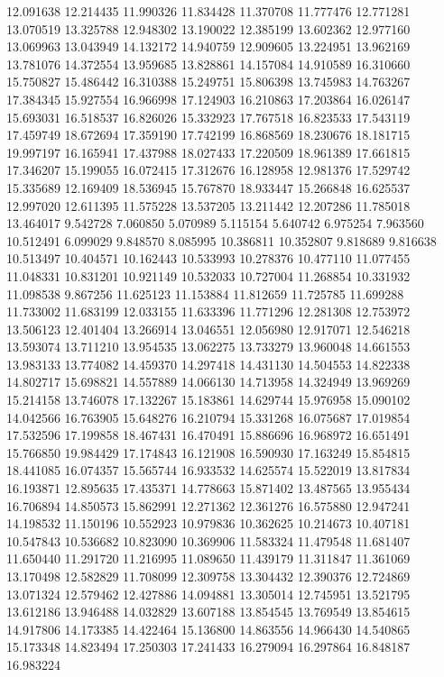 12.091638
12.214435
11.990326
11.834428
11.370708
11.777476
12.771281
13.070519
13.325788
12.948302
13.190022
12.385199
13.602362
12.977160
13.069963
13.043949
14.132172
14.940759
12.909605
13.224951
13.962169
13.781076
14.372554
13.959685
13.828861
14.157084
14.910589
16.310660
15.750827
15.486442
16.310388
15.249751
15.806398
13.745983
14.763267
17.384345
15.927554
16.966998
17.124903
16.210863
17.203864
16.026147
15.693031
16.518537
16.826026
15.332923
17.767518
16.823533
17.543119
17.459749
18.672694
17.359190
17.742199
16.868569
18.230676
18.181715
19.997197
16.165941
17.437988
18.027433
17.220509
18.961389
17.661815
17.346207
15.199055
16.072415
17.312676
16.128958
12.981376
17.529742
15.335689
12.169409
18.536945
15.767870
18.933447
15.266848
16.625537
12.997020
12.611395
11.575228
13.537205
13.211442
12.207286
11.785018
13.464017
9.542728
7.060850
5.070989
5.115154
5.640742
6.975254
7.963560
10.512491
6.099029
9.848570
8.085995
10.386811
10.352807
9.818689
9.816638
10.513497
10.404571
10.162443
10.533993
10.278376
10.477110
11.077455
11.048331
10.831201
10.921149
10.532033
10.727004
11.268854
10.331932
11.098538
9.867256
11.625123
11.153884
11.812659
11.725785
11.699288
11.733002
11.683199
12.033155
11.633396
11.771296
12.281308
12.753972
13.506123
12.401404
13.266914
13.046551
12.056980
12.917071
12.546218
13.593074
13.711210
13.954535
13.062275
13.733279
13.960048
14.661553
13.983133
13.774082
14.459370
14.297418
14.431130
14.504553
14.822338
14.802717
15.698821
14.557889
14.066130
14.713958
14.324949
13.969269
15.214158
13.746078
17.132267
15.183861
14.629744
15.976958
15.090102
14.042566
16.763905
15.648276
16.210794
15.331268
16.075687
17.019854
17.532596
17.199858
18.467431
16.470491
15.886696
16.968972
16.651491
15.766850
19.984429
17.174843
16.121908
16.590930
17.163249
15.854815
18.441085
16.074357
15.565744
16.933532
14.625574
15.522019
13.817834
16.193871
12.895635
17.435371
14.778663
15.871402
13.487565
13.955434
16.706894
14.850573
15.862991
12.271362
12.361276
16.575880
12.947241
14.198532
11.150196
10.552923
10.979836
10.362625
10.214673
10.407181
10.547843
10.536682
10.823090
10.369906
11.583324
11.479548
11.681407
11.650440
11.291720
11.216995
11.089650
11.439179
11.311847
11.361069
13.170498
12.582829
11.708099
12.309758
13.304432
12.390376
12.724869
13.071324
12.579462
12.427886
14.094881
13.305014
12.745951
13.521795
13.612186
13.946488
14.032829
13.607188
13.854545
13.769549
13.854615
14.917806
14.173385
14.422464
15.136800
14.863556
14.966430
14.540865
15.173348
14.823494
17.250303
17.241433
16.279094
16.297864
16.848187
16.983224
